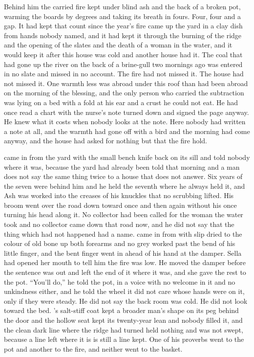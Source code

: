 Behind him the carried fire kept under blind ash and the back of a broken pot, warming the boards by degrees and taking its breath in fours. Four, four and a gap. It had kept that count since the year's fire came up the yard in a clay dish from hands nobody named, and it had kept it through the burning of the ridge and the opening of the slates and the death of a woman in the water, and it would keep it after this house was cold and another house had it. The coal that had gone up the river on the back of a brine-gull two mornings ago was entered in no slate and missed in no account. The fire had not missed it. The house had not missed it. One warmth less was abroad under this roof than had been abroad on the morning of the blessing, and the only person who carried the subtraction was lying on a bed with a fold at his ear and a crust he could not eat. He had once read a chart with the nurse's note turned down and signed the page anyway. He knew what it costs when nobody looks at the note. Here nobody had written a note at all, and the warmth had gone off with a bird and the morning had come anyway, and the house had asked for nothing but that the fire hold.

\scenebreak

 came in from the yard with the small bench knife back on its sill and told nobody where it was, because the yard had already been told that morning and a man does not say the same thing twice to a house that does not answer. Six years of the seven were behind him and he held the seventh where he always held it, and Ash was worked into the creases of his knuckles that no scrubbing lifted. His broom went over the road down toward  once and then again without his once turning his head along it. No collector had been called for the woman the water took and no collector came down that road now, and he did not say that the thing which had not happened had a name.  came in from  with slip dried to the colour of old bone up both forearms and no grey worked past the bend of his little finger, and the bent finger went in ahead of his hand at the damper. Sella had opened her mouth to tell him the fire was low. He moved the damper before the sentence was out and left the end of it where it was, and she gave the rest to the pot. “You'll do,” he told the pot, in a voice with no welcome in it and no unkindness either, and he told the wheel it did not care whose hands were on it, only if they were steady. He did not say the back room was cold. He did not look toward the bed. 's salt-stiff coat kept a broader man's shape on its peg behind the door and the hollow seat kept its twenty-year lean and nobody filled it, and the clean dark line where the ridge had turned held nothing and was not swept, because a line left where it is is still a line kept. One of his proverbs went to the pot and another to the fire, and neither went to the basket.

